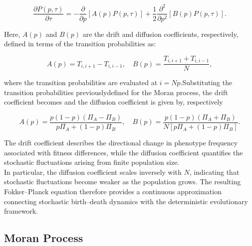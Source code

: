 \begin{equation}
    \frac{\partial P(p,\tau)}{\partial \tau}
    =
    -\frac{\partial}{\partial p}
    \left[A(p)P(p,\tau)\right]
    +
    \frac{1}{2}
    \frac{\partial^2}{\partial p^2}
    \left[B(p)P(p,\tau)\right].
    \label{eq:FokkerPlanck}
\end{equation}

Here, \(A(p)\) and \(B(p)\) are the drift and diffusion
coefficients, respectively, defined in terms of the
transition probabilities as: 

\begin{equation}
    A(p)=T_{i,i+1}-T_{i,i-1}, \quad   B(p)=\frac{T_{i,i+1}+T_{i,i-1}}{N}, 
    \label{eq:driftCoefficient}
\end{equation}

where the transition probabilities are evaluated at \(i=Np\).Substituting the transition probabilities previouslydefined for the Moran process, the drift coefficient
becomes and the diffusion coefficient is given by, respectively

\begin{equation}
    A(p)=
    \frac{
        p(1-p)(\Pi_A-\Pi_B)
    }{
        p\Pi_A+(1-p)\Pi_B
    }, \quad  B(p)=
    \frac{
        p(1-p)(\Pi_A+\Pi_B)
    }{
        N[p\Pi_A+(1-p)\Pi_B]
    }.
    \label{eq:driftFitness}
\end{equation}

The drift coefficient describes the directional
change in phenotype frequency associated with fitness
differences, while the diffusion coefficient quantifies
the stochastic fluctuations arising from finite
population size.\\ 

In particular, the diffusion coefficient scales
inversely with \(N\), indicating that stochastic
fluctuations become weaker as the population grows.
The resulting Fokker--Planck equation therefore
provides a continuous approximation connecting
stochastic birth--death dynamics with the deterministic
evolutionary framework.


\subsection{Moran Process}
\label{sec:Moran}

